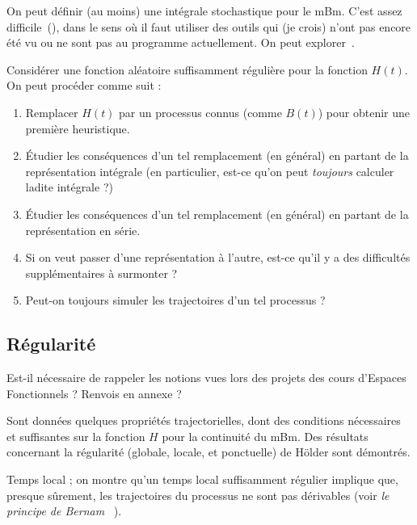 \begin{piste}
  On peut définir (au moins) une intégrale stochastique pour le
  mBm. C'est assez difficile~(\cite{lebovits2014}), dans le sens où il
  faut utiliser des outils qui (je crois) n'ont pas encore été vu ou
  ne sont pas au programme actuellement. On peut
  explorer~\cite{herbin2012}.
\end{piste}

\begin{piste}
  Considérer une fonction aléatoire suffisamment régulière pour la
  fonction $H(t)$. On peut procéder comme suit :
  \begin{enumerate}
  \item Remplacer $H(t)$ par un processus connus (comme $B(t)$) pour
    obtenir une première heuristique.
  \item Étudier les conséquences d'un tel remplacement (en général) en
    partant de la représentation intégrale (en particulier, est-ce
    qu'on peut \emph{toujours} calculer ladite intégrale ?)
  \item Étudier les conséquences d'un tel remplacement (en général) en
    partant de la représentation en série.
  \item Si on veut passer d'une représentation à l'autre, est-ce qu'il
    y a des difficultés supplémentaires à surmonter ?
  \item Peut-on toujours simuler les trajectoires d'un tel processus ?
  \end{enumerate}
\end{piste}

\subsection{Régularité}

\begin{question}
  Est-il nécessaire de rappeler les notions vues lors des projets des
  cours d'Espaces Fonctionnels ? Renvois en annexe ?
\end{question}

Sont données quelques propriétés trajectorielles, dont des conditions
nécessaires et suffisantes sur la fonction $H$ pour la continuité du
mBm. Des résultats concernant la régularité (globale, locale, et
ponctuelle) de Hölder sont démontrés.

\begin{prerequis}
  Temps local ; on montre qu'un temps local suffisamment régulier
  implique que, presque sûrement, les trajectoires du processus ne
  sont pas dérivables (voir \emph{\og le principe de Bernam
    \fg{}}~\cite[Sec.~2.3]{ayache2018}).
\end{prerequis}